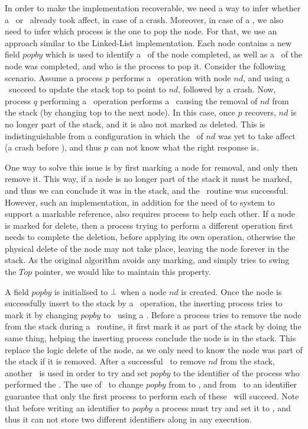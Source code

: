In order to make the implementation recoverable, we need a way to infer whether a \pop\ or \push\ already took affect, in case of a crash. Moreover, in case of a \pop, we also need to infer which process is the one to pop the node. For that, we use an approach similar to the Linked-List implementation. Each node contains a new field $popby$ which is used to identify a \push\ of the node completed, as well as a \pop\ of the node was completed, and who is the process to pop it.
Consider the following scenario. Assume a process $p$ performs a \push\ operation with node $nd$, and using a \CAS\ succeed to update the stack top to point to $nd$, followed by a crash. Now, process $q$ performing a \pop\ operation performs a \CAS\ causing the removal of $nd$ from the stack (by changing top to the next node). In this case, once $p$ recovers, $nd$ is no longer part of the stack, and it is also not marked as deleted. This is indistinguishable from a configuration in which the \push\ of $nd$ was yet to take affect (a crash before \CAS), and thus $p$ can not know what the right response is.

One way to solve this issue is by first marking a node for removal, and only then remove it. This way, if a node is no longer part of the stack it must be marked, and thus we can conclude it was in the stack, and the \push\ routine was successful. However, such an implementation, in addition for the need of to system to support a markable reference, also requires process to help each other. If a node is marked for delete, then a process trying to perform a different operation first needs to complete the deletion, before applying its own operation, otherwise the physical delete of the node may not take place, leaving the node forever in the stack. As the original algorithm avoids any marking, and simply tries to swing the $Top$ pointer, we would like to maintain this property.

A field $popby$ is initialised to $\mbox{$\bot$}$ when a node $nd$ is created. Once the node is successfully insert to the stack by a \push\ operation, the inserting process tries to mark it by changing $popby$ to \NULL\ using a \CAS. Before a process tries to remove the node from the stack during a \pop\ routine, it first mark it as part of the stack by doing the same thing, helping the inserting process conclude the node is in the stack. This replace the logic delete of the node, as we only need to know the node was part of the stack if it is removed. After a successful \CAS\ to remove $nd$ from the stack, another \CAS\ is used in order to try and set $popby$ to the identifier of the process who performed the \CAS. The use of \CAS\ to change $popby$ from \init to \NULL, and from \NULL\ to an identifier guarantee that only the first process to perform each of these \CAS\ will succeed. Note that before writing an identifier to $popby$ a process must try and set it to \NULL, and thus it can not store two different identifiers along in any execution.

